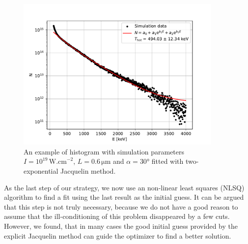 \begin{figure}[t]
	\centering
	\includegraphics[width=0.9\textwidth]{figures/hist_1e19_060_30_2exp}
	\caption{An example of histogram with simulation parameters $I=10^{19}\,\mathrm{W.cm}^{-2}$, $L=0.6\,\mathrm{\mu m}$ and $\alpha = 30$° fitted with two-exponential Jacquelin method.}
	\label{fig:2exp-fit-example}
\end{figure}

As the last step of our strategy, we now use an non-linear least squares (NLSQ) algorithm to find a fit using the last result as the initial guess. It can be argued that this step is not truly necessary, because we do not have a good reason to assume that the ill-conditioning of this problem disappeared by a few cuts. However, we found, that in many cases the good initial guess provided by the explicit Jacquelin method can guide the optimizer to find a better solution. 

